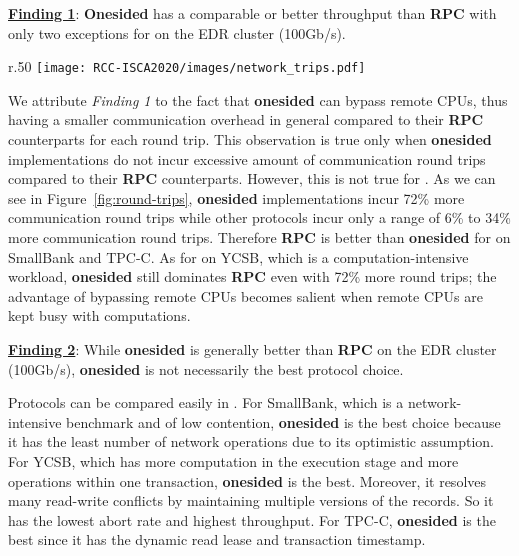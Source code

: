 \underline{\bf Finding 1}: \textbf{Onesided} has a comparable or better throughput than \textbf{RPC} with only two exceptions for \mvcc on the EDR cluster (100Gb/s). 

\setlength{\intextsep}{2pt}%
\setlength{\columnsep}{8pt}%
\begin{wrapfigure}[5]{r}{.50\linewidth}
    \centering
    \texttt{[image: RCC-ISCA2020/images/network\_trips.pdf]}
    \vspace{-0.6cm}
    \caption{Network Round Trips}
    \vspace{-0.3cm}
    \label{fig:round-trips}
\end{wrapfigure}
We attribute \textit{Finding 1} to the fact that \textbf{onesided} can bypass remote CPUs, thus having a smaller communication overhead in general compared to their \textbf{RPC} counterparts for each round trip. This observation is true only when \textbf{onesided} implementations do not incur excessive amount of communication round trips compared to their \textbf{RPC} counterparts. However, this is not true for \mvcc. As we can see in Figure~\ref{fig:round-trips}, \textbf{onesided} \mvcc implementations incur 72\% more communication round trips while other protocols incur only a range of 6\% to 34\% more communication round trips. Therefore \textbf{RPC} is better than \textbf{onesided} for \mvcc on SmallBank and TPC-C. As for \mvcc on YCSB, which is a computation-intensive workload, \textbf{onesided} still dominates \textbf{RPC} even with 72\% more round trips; the advantage of bypassing remote CPUs becomes salient when remote CPUs are kept busy with computations.



\underline{\bf Finding 2}: While \textbf{onesided} is generally better than \textbf{RPC} on the EDR cluster (100Gb/s), \textbf{onesided} \occ is not necessarily the best protocol choice.

Protocols can be compared easily in \projectname. For SmallBank, which is a network-intensive benchmark and of low contention, \textbf{onesided} \occ is the best choice 
because it has the least number of network operations due to its optimistic assumption. For YCSB, which has more computation in the execution stage and more operations within one transaction, \textbf{onesided} \mvcc is the best. Moreover, it resolves many read-write conflicts by maintaining multiple versions of the records. So it has the lowest abort rate and highest throughput. For TPC-C, \textbf{onesided} \sundial is the best since it has the dynamic read lease and transaction timestamp. 

